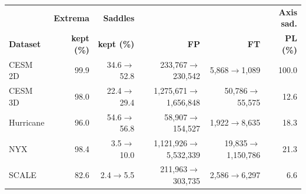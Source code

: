 \begin{tabular}{@{}lrrrrr@{}}
\toprule
 & \textbf{Extrema} & \textbf{Saddles} & & & \textbf{Axis sad.} \\
\textbf{Dataset} & \textbf{kept (\%)} & \textbf{kept (\%)} & \textbf{FP} & \textbf{FT} & \textbf{PL (\%)} \\
\midrule
CESM 2D & 99.9 & 34.6$\to$52.8 & 233{,}767$\to$230{,}542 & 5{,}868$\to$1{,}089 & 100.0 \\
CESM 3D & 98.0 & 22.4$\to$29.4 & 1{,}275{,}671$\to$1{,}656{,}848 & 50{,}786$\to$55{,}575 & 12.6 \\
Hurricane & 96.0 & 54.6$\to$56.8 & 58{,}907$\to$154{,}527 & 1{,}922$\to$8{,}635 & 18.3 \\
NYX & 98.4 & 3.5$\to$10.0 & 1{,}121{,}926$\to$5{,}532{,}339 & 19{,}835$\to$1{,}150{,}786 & 21.3 \\
SCALE & 82.6 & 2.4$\to$5.5 & 211{,}963$\to$303{,}735 & 2{,}586$\to$6{,}297 & 6.6 \\
\bottomrule
\end{tabular}
